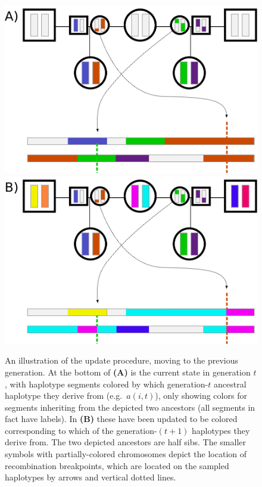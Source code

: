 \documentclass{article}
\begin{document}
\begin{figure}[!htp]
  \begin{center}
    \includegraphics[width=.35\textwidth]{meioses-1}
\hspace{.1\textwidth}
    \includegraphics[width=.35\textwidth]{meioses-2}
    \caption{
        \label{fig:updates}
        An illustration of the update procedure, moving to the previous generation.
At the bottom of {\bf (A)} is the current state in generation $t$, with haplotype segments
colored by which generation-$t$ ancestral haplotype they derive from (e.g.~$a(i,t)$),
only showing colors for segments inheriting from the depicted two ancestors
(all segments in fact have labels).
In {\bf (B)} these have been updated to be colored corresponding to which of the generation-$(t+1)$ haplotypes they derive from.
The two depicted ancestors are half sibs.
The smaller symbols with partially-colored chromosomes depict the location of recombination breakpoints,
which are located on the sampled haplotypes by arrows and vertical dotted lines.
    }
  \end{center}
\end{figure}
\end{document}
